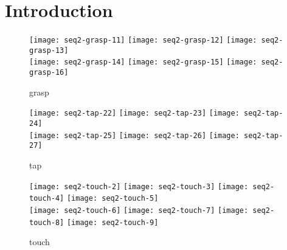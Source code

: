 
\section{Introduction}

\newcommand{\myWidthOne}{0.3}
\newcommand{\myWidthTwo}{0.22}

\begin{figure*}
    \centering
    \subfloat
    { \texttt{[image: seq2-grasp-11]} } \quad
    \subfloat
    { \texttt{[image: seq2-grasp-12]} } \quad
    \subfloat
    { \texttt{[image: seq2-grasp-13]} } \\
    \subfloat
    { \texttt{[image: seq2-grasp-14]} } \quad
    \subfloat
    { \texttt{[image: seq2-grasp-15]} } \quad
    \subfloat
    { \texttt{[image: seq2-grasp-16]} }
    \caption{grasp}
\end{figure*}

\begin{figure*}
    \centering
    \subfloat
    { \texttt{[image: seq2-tap-22]} } \quad
    \subfloat
    { \texttt{[image: seq2-tap-23]} } \quad
    \subfloat
    { \texttt{[image: seq2-tap-24]} } \\
    \subfloat
    { \texttt{[image: seq2-tap-25]} } \quad
    \subfloat
    { \texttt{[image: seq2-tap-26]} } \quad
    \subfloat
    { \texttt{[image: seq2-tap-27]} }
    \caption{tap}
\end{figure*}

\begin{figure*}
    \centering
    \subfloat
    { \texttt{[image: seq2-touch-2]} } \quad
    \subfloat
    { \texttt{[image: seq2-touch-3]} } \quad
    \subfloat
    { \texttt{[image: seq2-touch-4]} } \quad
    \subfloat
    { \texttt{[image: seq2-touch-5]} } \\
    \subfloat
    { \texttt{[image: seq2-touch-6]} } \quad
    \subfloat
    { \texttt{[image: seq2-touch-7]} } \quad
    \subfloat
    { \texttt{[image: seq2-touch-8]} } \quad
    \subfloat
    { \texttt{[image: seq2-touch-9]} }
    \caption{touch}
\end{figure*}

